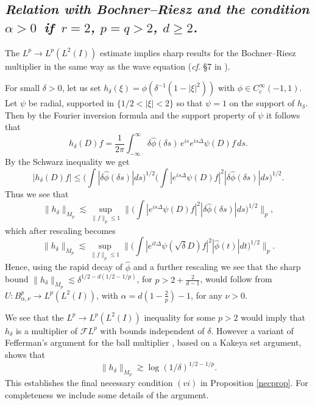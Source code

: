 \documentclass[11pt]{amsart}
\theoremstyle{definition}
\numberwithin{theorem}{section}
\numberwithin{definition}{section}
\numberwithin{equation}{section}
\newcommand{\Be}{\begin{equation}}
\newcommand{\Ee}{\end{equation}}
\renewcommand{\le}{\leqslant}
\renewcommand{\ge}{\geqslant}
\def\cf{{\it cf}}
\def\lc{\lesssim}
\def\gc{\gtrsim}
\def\cF{{\mathcal {F}}}
\renewcommand{\le}{\leqslant}
\renewcommand{\ge}{\geqslant}
\begin{document}
\subsection{\it Relation with Bochner--Riesz and the condition $\alpha>  0$\  if\,  $r=2$, $p=q>2$, $d\ge 2$. }\label{secondbesch}
The $L^p\to L^p(L^2(I))$  estimate implies sharp
results for the Bochner--Riesz multiplier in the same way as the wave equation (\cf. \S7 in \cite{mss}).

For small $\delta>0$, let us set
$h_\delta(\xi)= \phi(\delta^{-1}(1-|\xi|^2))$ with $\phi\in C_c^\infty(-1,1)$. Let $\psi$ be radial, supported in $\{1/2<|\xi|<2\}$ so that $\psi=1$ on the support of $h_{\delta}$.
Then by the Fourier inversion formula and the support property of $\psi$ it follows that
$$
h_\delta (D)f= \frac {1}{2\pi}  \int_{-\infty}^\infty
\delta\widehat \phi(\delta s )\, e^{i s } e^{i s \Delta} \psi(D) f\, d s .
$$
By the Schwarz inequality  we get
$$|h_\delta (D)f|\le
\Big(\int |\delta\widehat\phi(\delta  s )|d s \Big)^{1/2}
\Big(\int|e^{i s \Delta }\psi(D) f|^2 |\delta\widehat \phi (\delta s )|d s \Big)^{1/2}.
$$
Thus we  see that
$$
\|h_\delta\|_{M_p} \lc   \sup_{\|f\|_p\le 1}\Big \| \Big(\int|e^{i s \Delta }\psi( D) f|^2 |\delta\widehat \phi (\delta s )|d s \Big)^{1/2} \Big \|_p,%
$$
which after rescaling becomes
$$
\|h_\delta\|_{M_p} \lc
\sup_{\|f\|_p\le 1}\Big \| \Big(\int|e^{it\Delta }\psi( \sqrt\delta D) f|^2 |\widehat \phi (t)|dt\Big)^{1/2} \Big \|_p .$$
Hence, using the rapid decay of $\widehat \phi$ and a further rescaling we see that the  sharp bound $\|h_\delta\|_{M_p} \lc\delta^{1/2-d(1/2-1/p)}$, for $p>2+\frac{2}{d-1}$, would follow from  $U: B^p_{\alpha,\nu}\to L^p (L^2(I))$, with $\alpha=d(1-\frac2p)-1$, for any $\nu>0$.


 We see that the
$L^p\to L^p (L^2(I))$ inequality for some $p> 2$  would imply that
$h_\delta$ is a multiplier of $\cF L^p$ with bounds independent of $\delta$.
However   a variant of Fefferman's argument for the
ball multiplier \cite{F}, based on a Kakeya set argument,
 shows that
 \Be \label{hbound2}
 \|h_\delta\|_{M_p} \gc \log (1/\delta)^{1/2-1/p}.
 \Ee
This
 establishes the final necessary condition $(vi)$
in Proposition \ref{necprop}.
For completeness we  include some details of the argument.
\end{document}
